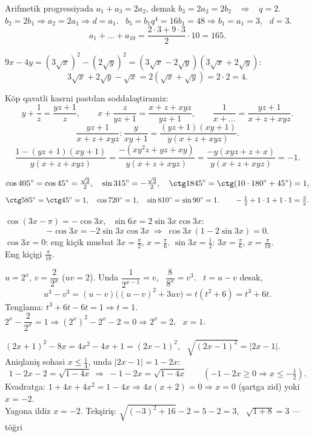 Arifmetik progressiyada $a_1+a_3=2a_2$, demak $b_3=2a_2=2b_2$ \ $\Rightarrow$ \ $q=2$.\\
$b_2=2b_1\Rightarrow a_2=2a_1\Rightarrow d=a_1$. \ $b_5=b_1q^4=16b_1=48\Rightarrow b_1=a_1=3$, \ $d=3$.
\[a_1+\dots+a_{10}=\frac{2\cdot3+9\cdot3}2\cdot10=165.\]

$9x-4y=(3\sqrt x)^2-(2\sqrt y)^2=(3\sqrt x-2\sqrt y)(3\sqrt x+2\sqrt y)$:
\[3\sqrt x+2\sqrt y-\sqrt x=2(\sqrt x+\sqrt y)=2\cdot2=4.\]

Köp qavatli kasrni pastdan soddalaştiramiz:
\[y+\frac1z=\frac{yz+1}z,\qquad x+\frac z{yz+1}=\frac{x+z+xyz}{yz+1},\qquad \frac1{x+\dots}=\frac{yz+1}{x+z+xyz}.\]
\[\frac{yz+1}{x+z+xyz}:\frac y{xy+1}=\frac{(yz+1)(xy+1)}{y(x+z+xyz)}.\]
\[\frac{1-(yz+1)(xy+1)}{y(x+z+xyz)}=\frac{-(xy^2z+yz+xy)}{y(x+z+xyz)}=\frac{-y(xyz+z+x)}{y(x+z+xyz)}=-1.\]

\[\cos405^\circ=\cos45^\circ=\tfrac{\sqrt2}2,\quad \sin315^\circ=-\tfrac{\sqrt2}2,\quad \ctg1845^\circ=\ctg(10\cdot180^\circ+45^\circ)=1,\]\[\ctg585^\circ=\ctg45^\circ=1,\quad\cos720^\circ=1,\quad \sin810^\circ=\sin90^\circ=1.\qquad -\tfrac12+1\cdot1+1\cdot1=\tfrac32.\]

$\cos(3x-\pi)=-\cos3x$, \ $\sin6x=2\sin3x\cos3x$:
\[-\cos3x=-2\sin3x\cos3x\ \Rightarrow\ \cos3x\,(1-2\sin3x)=0.\]
$\cos3x=0$: eng kiçik musbat $3x=\frac\pi2$, $x=\frac\pi6$. \quad $\sin3x=\frac12$: $3x=\frac\pi6$, $x=\frac\pi{18}$.\\
Eng kiçigi $\frac\pi{18}$.

$u=2^x$, $v=\dfrac2{2^x}$ ($uv=2$). Unda $\dfrac1{2^{x-1}}=v$, \ $\dfrac8{8^x}=v^3$. \ $t=u-v$ desak,
\[u^3-v^3=(u-v)\bigl((u-v)^2+3uv\bigr)=t(t^2+6)=t^3+6t.\]
Tenglama: $t^3+6t-6t=1\Rightarrow t=1$. \ $2^x-\dfrac2{2^x}=1\Rightarrow (2^x)^2-2^x-2=0\Rightarrow 2^x=2$, \ $x=1$.

$(2x+1)^2-8x=4x^2-4x+1=(2x-1)^2$, \ $\sqrt{(2x-1)^2}=|2x-1|$. Aniqlaniş sohasi $x\le\frac14$, unda $|2x-1|=1-2x$:
\[1-2x-2=\sqrt{1-4x}\ \Rightarrow\ -1-2x=\sqrt{1-4x}\qquad(-1-2x\ge0\Rightarrow x\le-\tfrac12).\]
Kvadratga: $1+4x+4x^2=1-4x\Rightarrow 4x(x+2)=0\Rightarrow x=0$ (şartga zid) yoki $x=-2$.\\
Yagona ildiz $x=-2$. Tekşiriş: $\sqrt{(-3)^2+16}-2=5-2=3$, \ $\sqrt{1+8}=3$ — töğri


